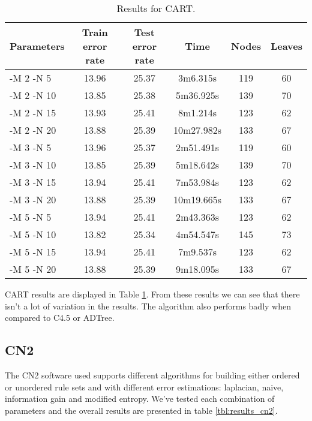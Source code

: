 \documentclass[a4paper]{llncs}
\begin{document}
\begin{table}[ht]
  \begin{center}
  \begin{tabular}{ | l | c | c | c | c | c |}
    \hline
    \textbf{Parameters} & \textbf{Train error rate} & \textbf{Test error rate} & \textbf{Time} & \textbf{Nodes} & \textbf{Leaves} \\ \hline
    -M 2 -N 5 & 13.96 & 25.37 & 3m6.315s & 119 & 60 \\ \hline
    -M 2 -N 10 & 13.85 & 25.38 & 5m36.925s & 139 & 70 \\ \hline
    -M 2 -N 15 & 13.93 & 25.41 & 8m1.214s & 123 & 62 \\ \hline
    -M 2 -N 20 & 13.88 & 25.39 & 10m27.982s & 133 & 67 \\ \hline
    
    -M 3 -N 5 & 13.96 & 25.37 & 2m51.491s & 119 & 60 \\ \hline
    -M 3 -N 10 & 13.85 & 25.39 & 5m18.642s & 139 & 70 \\ \hline
    -M 3 -N 15 & 13.94 & 25.41 & 7m53.984s & 123 & 62 \\ \hline
    -M 3 -N 20 & 13.88 & 25.39 & 10m19.665s & 133 & 67 \\ \hline
    
    -M 5 -N 5 & 13.94 & 25.41 & 2m43.363s & 123 & 62 \\ \hline
    -M 5 -N 10 & 13.82 & 25.34 & 4m54.547s & 145 & 73 \\ \hline
    -M 5 -N 15 & 13.94 & 25.41 & 7m9.537s & 123 & 62 \\ \hline
    -M 5 -N 20 & 13.88 & 25.39 & 9m18.095s & 133 & 67 \\ \hline
  \end{tabular}
  \caption{Results for CART.}
  \label{tbl:results_cart}
  \end{center}
\end{table}

CART results are displayed in Table \ref{tbl:results_cart}.
From these results we can see that there isn't a lot of variation in the results.
The algorithm also performs badly when compared to C4.5 or ADTree.

\subsection{CN2}

The CN2 software used supports different algorithms for building either ordered
or unordered rule sets and with different error estimations: laplacian, naive,
information gain and modified entropy. We've tested each combination of
parameters and the overall results are presented in table \ref{tbl:results_cn2}.
\end{document}
